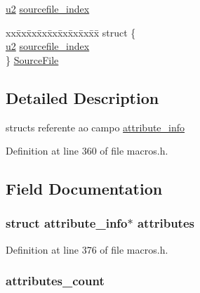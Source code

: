 \begin{DoxyCompactItemize}
\begin{tabbing}
\end{tabbing}\item 
\hyperlink{macros_8h_aa76d8c8015643c6a837661a10142016e}{u2} \hyperlink{structattribute__info_a84ee4fb337ef79f587712533075a6bbc}{sourcefile\+\_\+index}
\item 
\begin{tabbing}
xx\=xx\=xx\=xx\=xx\=xx\=xx\=xx\=xx\=\kill
struct \{\\
\>\hyperlink{macros_8h_aa76d8c8015643c6a837661a10142016e}{u2} \hyperlink{structattribute__info_a84ee4fb337ef79f587712533075a6bbc}{sourcefile\_index}\\
\} \hyperlink{structattribute__info_a3ac5389678482c99209a13a7c95873c1}{SourceFile}\\

\end{tabbing}\end{DoxyCompactItemize}


\subsection{Detailed Description}
structs referente ao campo \hyperlink{structattribute__info}{attribute\+\_\+info} 

Definition at line 360 of file macros.\+h.



\subsection{Field Documentation}
\hypertarget{structattribute__info_a13aef7cb175fd7b539ca63bf8b7bf7b5}{}
\subsubsection[{attributes}]{\setlength{\rightskip}{0pt plus 5cm}struct {\bf attribute\+\_\+info}$\ast$ attributes}\label{structattribute__info_a13aef7cb175fd7b539ca63bf8b7bf7b5}


Definition at line 376 of file macros.\+h.

\hypertarget{structattribute__info_aa53122439ee827a418258d52c51368c6}{}
\subsubsection[{attributes\+\_\+count}]{ attributes\+\_\+count}\label{structattribute__info_aa53122439ee827a418258d52c51368c6}


